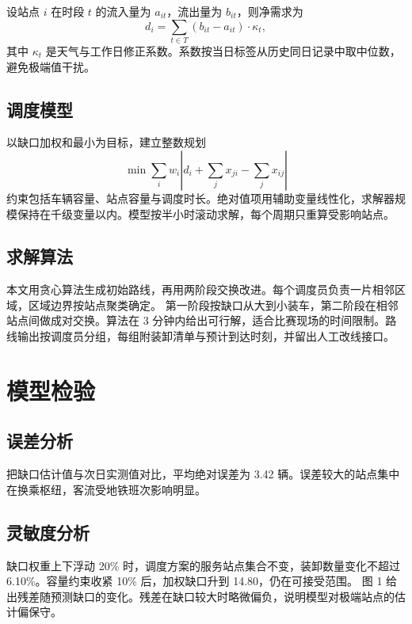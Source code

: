 \documentclass[12pt,a4paper]{article}
\begin{document}
设站点 $i$ 在时段 $t$ 的流入量为 $a_{it}$，流出量为 $b_{it}$，则净需求为
\begin{equation}
d_i=\sum_{t\in T}\left(b_{it}-a_{it}\right)\cdot \kappa_t ,
\end{equation}
其中 $\kappa_t$ 是天气与工作日修正系数。系数按当日标签从历史同日记录中取中位数，避免极端值干扰。

\subsection{调度模型}

以缺口加权和最小为目标，建立整数规划
\begin{equation}
\min \sum_i w_i \left| d_i+\sum_j x_{ji}-\sum_j x_{ij}\right|
\end{equation}
约束包括车辆容量、站点容量与调度时长。绝对值项用辅助变量线性化，求解器规模保持在千级变量以内。模型按半小时滚动求解，每个周期只重算受影响站点。

\subsection{求解算法}

本文用贪心算法生成初始路线，再用两阶段交换改进。每个调度员负责一片相邻区域，区域边界按站点聚类确定。
第一阶段按缺口从大到小装车，第二阶段在相邻站点间做成对交换。算法在 3 分钟内给出可行解，适合比赛现场的时间限制。路线输出按调度员分组，每组附装卸清单与预计到达时刻，并留出人工改线接口。

\section{模型检验}

\subsection{误差分析}

把缺口估计值与次日实测值对比，平均绝对误差为 3.42 辆。误差较大的站点集中在换乘枢纽，客流受地铁班次影响明显。

\subsection{灵敏度分析}

缺口权重上下浮动 20\% 时，调度方案的服务站点集合不变，装卸数量变化不超过 6.10\%。容量约束收紧 10\% 后，加权缺口升到 14.80，仍在可接受范围。
图 1 给出残差随预测缺口的变化。残差在缺口较大时略微偏负，说明模型对极端站点的估计偏保守。
\end{document}

